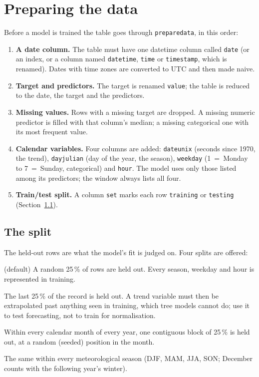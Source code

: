 \documentclass[11pt]{report}
\newcommand{\nosep}{\setlength{\itemsep}{0pt}\setlength{\parskip}{0pt}\setlength{\topsep}{2pt}}
\newcommand{\codeunderscore}{\textunderscore\allowbreak}
\newcommand{\code}[1]{\texttt{\let\_\codeunderscore #1}}
\begin{document}
\section{Preparing the data}\label{sec:prepare}
Before a model is trained the table goes through \code{prepare\_data}, in this order:
\begin{enumerate}\nosep
  \item \textbf{A date column.} The table must have one datetime column called
        \code{date} (or an index, or a column named \code{datetime}, \code{time} or
        \code{timestamp}, which is renamed). Dates with time zones are converted to UTC
        and then made naive.
  \item \textbf{Target and predictors.} The target is renamed \code{value}; the table is
        reduced to the date, the target and the predictors.
  \item \textbf{Missing values.} Rows with a missing target are dropped. A missing
        numeric predictor is filled with that column's median; a missing categorical
        one with its most frequent value.
  \item \textbf{Calendar variables.} Four columns are added: \code{date\_unix} (seconds
        since 1970, the trend), \code{day\_julian} (day of the year, the season),
        \code{weekday} (1~=~Monday to 7~=~Sunday, categorical) and \code{hour}.
        The model uses only those listed among its predictors; the window always lists
        all four.
  \item \textbf{Train/test split.} A column \code{set} marks each row
        \code{training} or \code{testing} (Section~\ref{sec:split}).
\end{enumerate}

\subsection{The split}\label{sec:split}
The held-out rows are what the model's fit is judged on. Four splits are offered:
\begin{description}\nosep
  \item[\code{random}] (default) A random 25\,\% of rows are held out. Every season,
        weekday and hour is represented in training.
  \item[\code{ts}] The last 25\,\% of the record is held out. A trend variable must then
        be extrapolated past anything seen in training, which tree models cannot do;
        use it to test forecasting, not to train for normalisation.
  \item[\code{month\_ts}] Within every calendar month of every year, one contiguous
        block of 25\,\% is held out, at a random (seeded) position in the month.
  \item[\code{season\_ts}] The same within every meteorological season (DJF, MAM, JJA,
        SON; December counts with the following year's winter).
\end{description}
\end{document}

